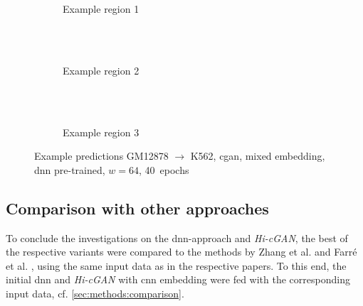 \begin{figure}[p] %
    \begin{subfigure}{\textwidth}
        \centering
        \caption{Example  region 1} \label{fig:results:cGAN64_pretrained_mixed_r1}
    \end{subfigure}\\[2mm]
    \\[3mm]
    \begin{subfigure}{\textwidth}
        \centering
        \caption{Example region 2} \label{fig:results:cGAN64_pretrained_mixed_r2}
    \end{subfigure}\\[2mm]
    \\[3mm]
    \begin{subfigure}{\textwidth}
        \centering
        \caption{Example region 3} \label{fig:results:cGAN64_pretrained_mixed_r3}
    \end{subfigure}
    \caption{Example predictions GM12878 $\rightarrow$ K562, \acrshort{cgan}, mixed embedding, \acrshort{dnn} pre-trained, $w=64$, 40~epochs} 
     \label{fig:results:GAN64_pretrained_mixed_matrices}
\end{figure}

\clearpage
\subsection{Comparison with other approaches}\label{sec:results:comparison}
To conclude the investigations on the \acrshort{dnn}-approach and \emph{Hi-cGAN},
the best of the respective variants were compared to the methods by Zhang et al. \cite{Zhang2019} and Farr\'e et al. \cite{Farre2018a},
using the same input data as in the respective papers.
To this end, the initial \acrshort{dnn} and \emph{Hi-cGAN} with \acrshort{cnn} embedding 
were fed with the corresponding input data, cf. \cref{sec:methods:comparison}.

